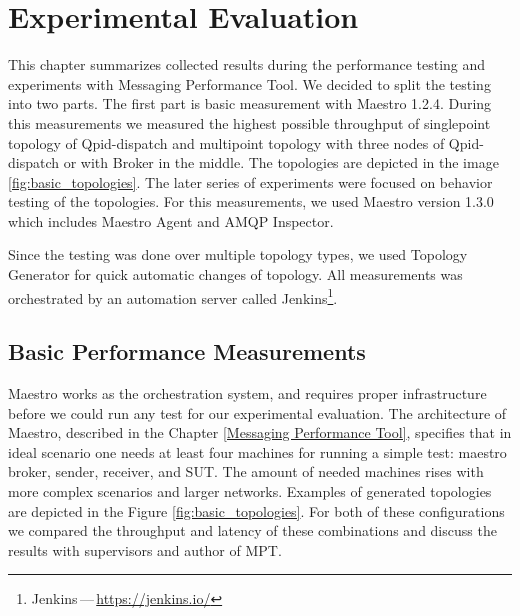 
\chapter{Experimental Evaluation}
\label{Experimental Evaluation}
This chapter summarizes collected results during the performance testing and experiments with Messaging Performance Tool. We decided to split the testing into two parts. The first part is basic measurement with Maestro 1.2.4. During this measurements we measured the highest possible throughput of singlepoint topology of Qpid-dispatch and multipoint topology with three nodes of Qpid-dispatch or with Broker in the middle. The topologies are depicted in the image \ref{fig:basic_topologies}. The later series of experiments were focused on behavior testing of the topologies. For this measurements, we used Maestro version 1.3.0 which includes Maestro Agent and AMQP Inspector.

Since the testing was done over multiple topology types, we used Topology Generator for quick automatic changes of topology. All measurements was orchestrated by an automation server called Jenkins\footnote{Jenkins\,---\,\url{https://jenkins.io/}}.

\section{Basic Performance Measurements}
\label{Basic Performance Measurements}
Maestro works as the orchestration system, and requires proper infrastructure before we could run any test for our experimental evaluation. The architecture of Maestro, described in the Chapter \ref{Messaging Performance Tool}, specifies that in ideal scenario one needs at least four machines for running a simple test: maestro broker, sender, receiver, and SUT. The amount of needed machines rises with more complex scenarios and larger networks. Examples of generated topologies are depicted in the Figure \ref{fig:basic_topologies}. For both of these configurations we compared the throughput and latency of these combinations and discuss the results with supervisors and author of MPT.

